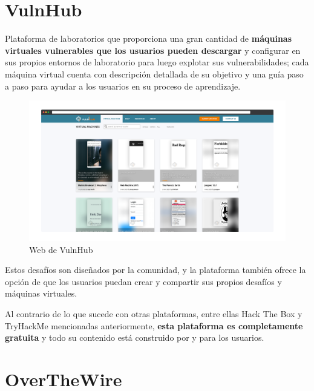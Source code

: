         \newpage
    
    
    \section{VulnHub}
    
        Plataforma de laboratorios que proporciona una gran cantidad de \textbf{máquinas virtuales vulnerables que los usuarios pueden descargar} y configurar en sus propios entornos de laboratorio para luego explotar sus vulnerabilidades; cada máquina virtual cuenta con descripción detallada de su objetivo y una guía paso a paso para ayudar a los usuarios en su proceso de aprendizaje.
        
        \begin{figure}[h]
            \centering
            \includegraphics[width=\textwidth]{images/Capturas/Web de VulnHub.png}
            \caption{Web de VulnHub}
            \label{fig:VulnHub-web}
        \end{figure}
        
        Estos desafíos son diseñados por la comunidad, y la plataforma también ofrece la opción de que los usuarios puedan crear y compartir sus propios desafíos y máquinas virtuales.
        
        Al contrario de lo que sucede con otras plataformas, entre ellas Hack The Box y TryHackMe mencionadas anteriormente, \textbf{esta plataforma es completamente gratuita} y todo su contenido está construido por y para los usuarios.
        
        \newpage
    
    
    \section{OverTheWire}
    
